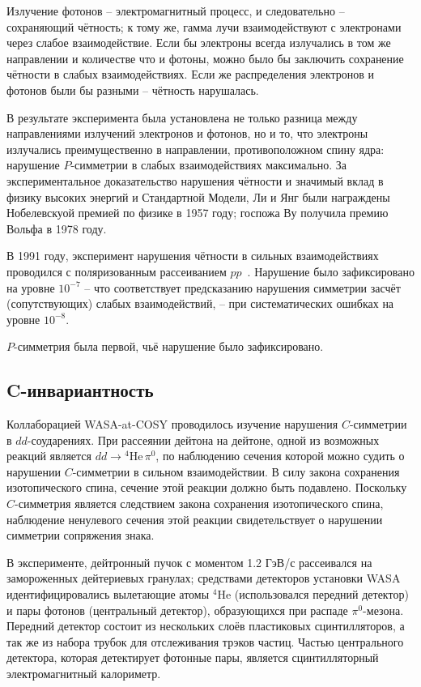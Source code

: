 \documentclass[14pt]{extarticle}
\begin{document}
Излучение фотонов -- электромагнитный процесс, и следовательно -- сохраняющий чётность; к тому же, гамма лучи взаимодействуют с электронами через слабое взаимодействие. Если бы электроны всегда излучались в том же направлении и количестве что и фотоны, можно было бы заключить сохранение чётности в слабых взаимодействиях. Если же распределения электронов и фотонов были бы разными -- чётность нарушалась.

В результате эксперимента была установлена не только разница между направлениями излучений электронов и фотонов, но и то, что электроны излучались преимущественно в направлении, противоположном спину ядра: нарушение $P$-симметрии в слабых взаимодействиях максимально.
%
За экспериментальное доказательство нарушения чётности и значимый вклад в физику высоких энергий и Стандартной Модели, Ли и Янг были награждены Нобелевскуой премией по физике в 1957 году; госпожа Ву получила премию Вольфа в 1978 году.

В 1991 году, эксперимент нарушения чётности в сильных взаимодействиях проводился с поляризованным рассеиванием $pp$~\cite{Eversheim}. Нарушение было зафиксировано на уровне $10^{-7}$ -- что соответствует предсказанию нарушения симметрии засчёт (сопутствующих) слабых взаимодействий, -- при систематических ошибках на уровне $10^{-8}$. 

$P$-симметрия была первой, чьё нарушение было зафиксировано.

\subsection{C-инвариантность}

Коллаборацией WASA-at-COSY проводилось изучение нарушения $C$-симметрии в $dd$-соударениях. \cite{WASA-at-COSY_Hepi} 
%
При рассеянии дейтона на дейтоне, одной из возможных реакций является $dd \to {^4}\mathrm{He}\,\pi^0$, по наблюдению сечения которой можно судить о нарушении $C$-симметрии в сильном взаимодействии. В силу закона сохранения изотопического спина, сечение этой реакции должно быть подавлено. Поскольку $C$-симметрия является следствием закона сохранения изотопического спина, наблюдение ненулевого сечения этой реакции свидетельствует о нарушении симметрии сопряжения знака.

В эксперименте, дейтронный пучок с моментом 1.2 ГэВ/с рассеивался на замороженных дейтериевых гранулах; средствами детекторов установки WASA идентифицировались вылетающие атомы ${^4\mathrm{He}}$ (использовался передний детектор) и пары фотонов (центральный детектор), образующихся при распаде $\pi^0$-мезона. Передний детектор состоит из нескольких слоёв пластиковых сцинтилляторов, а так же из набора трубок для отслеживания трэков частиц. Частью центрального детектора, которая детектирует фотонные пары, является сцинтилляторный электромагнитный калориметр.~\cite{WASA-at-COSY-Henpi}
\end{document}
